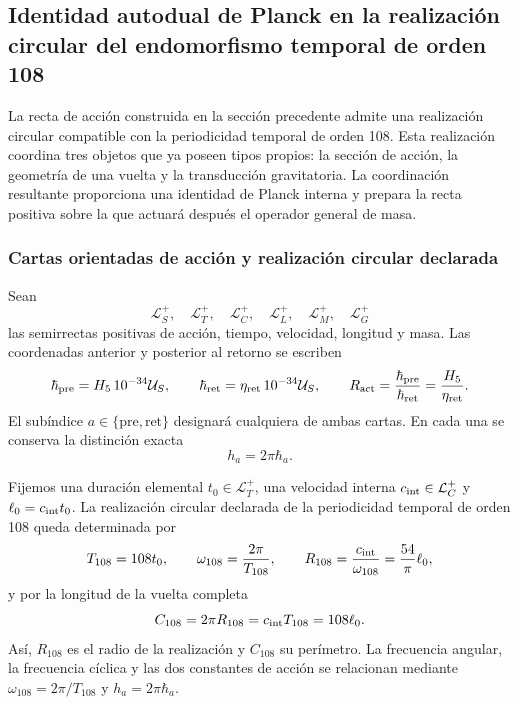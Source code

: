 \subsection[Identidad autodual de Planck sobre la periodicidad de orden 108]{Identidad autodual de
Planck en la realización circular del endomorfismo temporal de orden 108}
\label{sec:identidad-autodual-planck-ct108-rev3}

La recta de acción construida en la sección precedente admite una
realización circular compatible con la periodicidad temporal de orden 108.
Esta realización coordina tres objetos que ya poseen tipos propios: la
sección de acción, la geometría de una vuelta y la transducción
gravitatoria. La coordinación resultante proporciona una identidad de
Planck interna y prepara la recta positiva sobre la que actuará después el
operador general de masa.

\subsubsection{Cartas orientadas de acción y realización circular declarada}

Sean
\[
 \mathcal L_S^+,\quad \mathcal L_T^+,\quad \mathcal L_C^+,
 \quad \mathcal L_L^+,\quad \mathcal L_M^+,\quad \mathcal L_G^+
\]
las semirrectas positivas de acción, tiempo, velocidad, longitud y masa.
Las coordenadas anterior y posterior al retorno se escriben
\begin{equation}
 \hbar_{\rm pre}=H_5\,10^{-34}\mathcal U_S,
 \qquad
 \hbar_{\rm ret}=\eta_{\rm ret}\,10^{-34}\mathcal U_S,
 \qquad
 R_{\rm act}=\frac{\hbar_{\rm pre}}{\hbar_{\rm ret}}
 =\frac{H_5}{\eta_{\rm ret}}.
 \label{eq:planck-ct108-cartas-pre-ret-rev3}
\end{equation}
El subíndice \(a\in\{\mathrm{pre},\mathrm{ret}\}\) designará cualquiera
de ambas cartas. En cada una se conserva la distinción exacta
\begin{equation}
 h_a=2\pi\hbar_a .
 \label{eq:planck-ct108-h-hbar-rev3}
\end{equation}

Fijemos una duración elemental \(t_0\in\mathcal L_T^+\), una velocidad
interna \(c_{\rm int}\in\mathcal L_C^+\) y
\(\ell_0=c_{\rm int}t_0\). La realización circular declarada de la
periodicidad temporal de orden 108 queda determinada por
\begin{equation}
 T_{108}=108t_0,
 \qquad
 \omega_{108}=\frac{2\pi}{T_{108}},
 \qquad
 R_{108}=\frac{c_{\rm int}}{\omega_{108}}
 =\frac{54}{\pi}\ell_0,
 \label{eq:planck-ct108-realizacion-circular-rev3}
\end{equation}
y por la longitud de la vuelta completa
\begin{equation}
 C_{108}=2\pi R_{108}=c_{\rm int}T_{108}=108\ell_0.
 \label{eq:planck-ct108-perimetro-rev3}
\end{equation}
Así, \(R_{108}\) es el radio de la realización y \(C_{108}\) su
perímetro. La frecuencia angular, la frecuencia cíclica y las dos
constantes de acción se relacionan mediante
\(\omega_{108}=2\pi/T_{108}\) y \(h_a=2\pi\hbar_a\).

